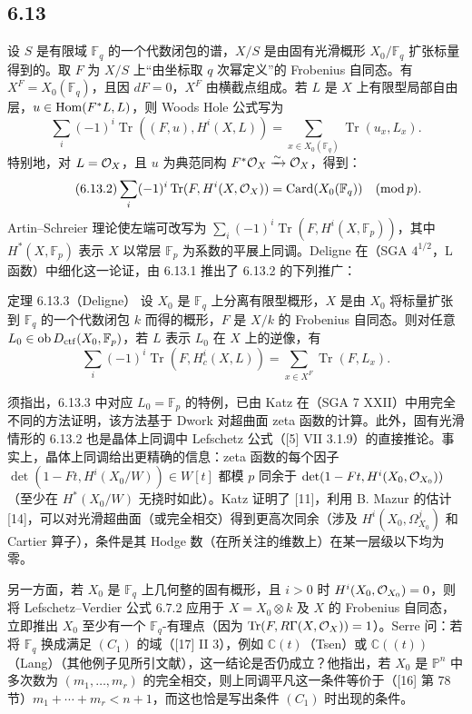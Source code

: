 \subsection*{6.13}
设 $S$ 是有限域 $\mathbb F_q$ 的一个代数闭包的谱，$X/S$ 是由固有光滑概形 $X_0/\mathbb F_q$ 扩张标量得到的。取 $F$ 为 $X/S$ 上“由坐标取 $q$ 次幂定义”的 Frobenius 自同态。有 $X^F=X_0(\mathbb F_q)$，且因 $dF=0$，$X^F$ 由横截点组成。若 $L$ 是 $X$ 上有限型局部自由层，$u\in\operatorname{Hom}(F^*L,L)$，则 Woods Hole 公式写为
\begin{equation}
\tag{6.13.1}
\sum_i(-1)^i\operatorname{Tr}((F,u),H^i(X,L))=
\sum_{x\in X_0(\mathbb F_q)}\operatorname{Tr}(u_x,L_x).
\end{equation}
特别地，对 $L=\mathcal{O}_X$，且 $u$ 为典范同构 $F^*\mathcal{O}_X\xrightarrow{\sim}\mathcal{O}_X$，得到：
\begin{equation}
\tag{6.13.2}
\sum_i(-1)^i\operatorname{Tr}(F,H^i(X,\mathcal{O}_X))=\operatorname{Card}(X_0(\mathbb F_q))\quad(\operatorname{mod} p).
\end{equation}
Artin--Schreier 理论使左端可改写为 $\sum_i(-1)^i\operatorname{Tr}(F,H^i(X,\mathbb F_p))$，其中 $H^*(X,\mathbb F_p)$ 表示 $X$ 以常层 $\mathbb F_p$ 为系数的平展上同调。Deligne 在（SGA $4^{1/2}$，L 函数）中细化这一论证，由 6.13.1 推出了 6.13.2 的下列推广：


\begin{statement}{定理 6.13.3（Deligne）}
设 $X_0$ 是 $\mathbb F_q$ 上分离有限型概形，$X$ 是由 $X_0$ 将标量扩张到 $\mathbb F_q$ 的一个代数闭包 $k$ 而得的概形，$F$ 是 $X/k$ 的 Frobenius 自同态。则对任意 $L_0\in\operatorname{ob} D_{\mathrm{ctf}}(X_0,\mathbb F_p)$，若 $L$ 表示 $L_0$ 在 $X$ 上的逆像，有
\[
\sum_i(-1)^i\operatorname{Tr}(F,H_c^i(X,L))=
\sum_{x\in X^F}\operatorname{Tr}(F,L_x).
\]
\end{statement}

须指出，6.13.3 中对应 $L_0=\mathbb F_p$ 的特例，已由 Katz 在（SGA 7 XXII）中用完全不同的方法证明，该方法基于 Dwork 对超曲面 zeta 函数的计算。此外，固有光滑情形的 6.13.2 也是晶体上同调中 Lefschetz 公式（[5] VII 3.1.9）的直接推论。事实上，晶体上同调给出更精确的信息：zeta 函数的每个因子 $\det(1-Ft,H^i(X_0/W))\in W[t]$ 都模 $p$ 同余于 $\det(1-Ft,H^i(X_0,\mathcal{O}_{X_0}))$（至少在 $H^*(X_0/W)$ 无挠时如此）。Katz 证明了 [11]，利用 B. Mazur 的估计 [14]，可以对光滑超曲面（或完全相交）得到更高次同余（涉及 $H^i(X_0,\Omega^j_{X_0})$ 和 Cartier 算子），条件是其 Hodge 数（在所关注的维数上）在某一层级以下均为零。

另一方面，若 $X_0$ 是 $\mathbb F_q$ 上几何整的固有概形，且 $i>0$ 时 $H^i(X_0,\mathcal{O}_{X_0})=0$，则将 Lefschetz--Verdier 公式 6.7.2 应用于 $X=X_0\otimes k$ 及 $X$ 的 Frobenius 自同态，立即推出 $X_0$ 至少有一个 $\mathbb F_q$-有理点（因为 $\operatorname{Tr}(F,R\Gamma(X,\mathcal{O}_X))=1$）。Serre 问：若将 $\mathbb F_q$ 换成满足 $(C_1)$ 的域（[17] II 3），例如 $\mathbb C(t)$（Tsen）或 $\mathbb C((t))$（Lang）（其他例子见所引文献），这一结论是否仍成立？他指出，若 $X_0$ 是 $\mathbb P^n$ 中多次数为 $(m_1,\ldots,m_r)$ 的完全相交，则上同调平凡这一条件等价于（[16] 第 78 节）$m_1+\cdots+m_r<n+1$，而这也恰是写出条件 $(C_1)$ 时出现的条件。

